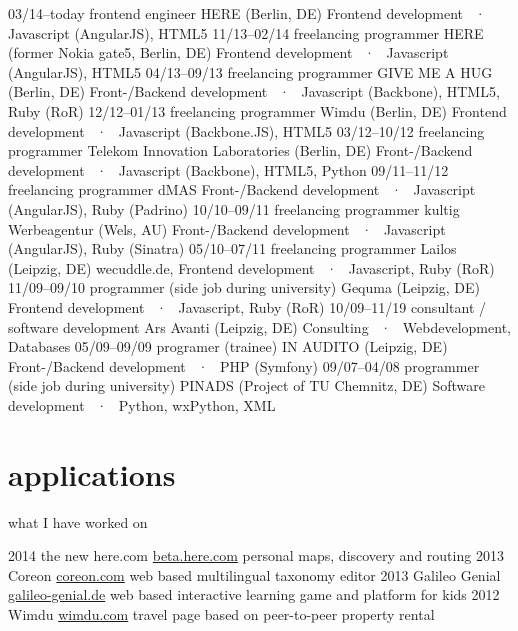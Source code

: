 \documentclass[]{friggeri-cv}
\begin{document}
\begin{entrylist}
  \entry
    {03/14–today}
    {frontend engineer}
    {HERE (Berlin, DE)}
    {Frontend development ~·~ Javascript (AngularJS), HTML5}
  \entry
    {11/13–02/14}
    {freelancing programmer}
    {HERE (former Nokia gate5, Berlin, DE)}
    {Frontend development ~·~ Javascript (AngularJS), HTML5}
  \entry
    {04/13–09/13}
    {freelancing programmer}
    {GIVE ME A HUG (Berlin, DE)}
    {Front-/Backend development ~·~ Javascript (Backbone), HTML5, Ruby (RoR)}
  \entry
    {12/12–01/13}
    {freelancing programmer}
    {Wimdu (Berlin, DE)}
    {Frontend development ~·~ Javascript (Backbone.JS), HTML5}
  \entry
    {03/12–10/12}
    {freelancing programmer}
    {Telekom Innovation Laboratories (Berlin, DE)}
    {Front-/Backend development ~·~ Javascript (Backbone), HTML5, Python}
  \entry
    {09/11–11/12}
    {freelancing programmer}
    {dMAS}
    {Front-/Backend development ~·~ Javascript (AngularJS), Ruby (Padrino)}
  \entry
    {10/10–09/11}
    {freelancing programmer}
    {kultig Werbeagentur (Wels, AU)}
    {Front-/Backend development ~·~ Javascript (AngularJS), Ruby (Sinatra)}
  \entry
    {05/10–07/11}
    {freelancing programmer}
    {Lailos (Leipzig, DE)}
    {wecuddle.de, Frontend development ~·~ Javascript, Ruby (RoR)}
  \entry
    {11/09–09/10}
    {programmer (side job during university)}
    {Gequma (Leipzig, DE)}
    {Frontend development ~·~ Javascript, Ruby (RoR)}
  \entry
    {10/09–11/19}
    {consultant / software development}
    {Ars Avanti (Leipzig, DE)}
    {Consulting ~·~ Webdevelopment, Databases}
  \entry
    {05/09–09/09}
    {programer (trainee)}
    {IN AUDITO (Leipzig, DE)}
    {Front-/Backend development ~·~ PHP (Symfony)}
  \entry
    {09/07–04/08}
    {programmer (side job during university)}
    {PINADS (Project of TU Chemnitz, DE)}
    {Software development ~·~ Python, wxPython, XML}
\end{entrylist}


\section{applications}
what I have worked on

\begin{entrylist}
  \entry
    {2014}
    {the new here.com}
    {\href{https://beta.here.com}{beta.here.com}}
    {personal maps, discovery and routing}
  \entry
    {2013}
    {Coreon}
    {\href{http://coreon.com}{coreon.com}}
    {web based multilingual taxonomy editor}
  \entry
    {2013}
    {Galileo Genial}
    {\href{http://news.galileo-genial.de}{galileo-genial.de}}
    {web based interactive learning game and platform for kids}
  \entry
    {2012}
    {Wimdu}
    {\href{http://wimdu.com}{wimdu.com}}
    {travel page based on peer-to-peer property rental}
\end{entrylist}
\end{document}
